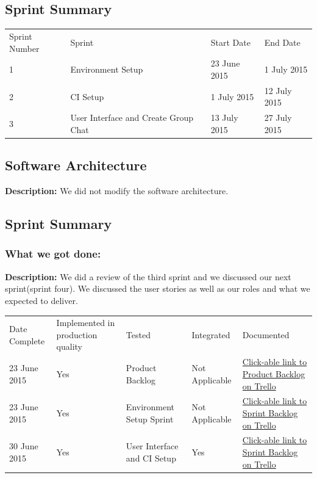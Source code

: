\documentclass[a4paper]{article}
\begin{document}
\subsection{Sprint Summary}
\setlength{\arrayrulewidth}{0.5mm}
\setlength{\tabcolsep}{12pt}
\renewcommand{\arraystretch}{2} 
\begin{tabular}{ |p{2.5cm}|p{2.5cm}|p{2.5cm} |p{2.5cm}| }
\hline
\rowcolor{lightgray}\multicolumn{4}{|c|}{Sprint Summary} \\
\hline
Sprint Number & Sprint & Start Date & End Date\\
\hline 
1 & Environment Setup & 23 June 2015 & 1 July 2015 \\
\hline
2 & CI Setup & 1 July 2015 & 12 July 2015 \\
\hline
3 & User Interface  and Create Group Chat & 13 July 2015 & 27 July 2015 \\
\hline

\end{tabular}

\subsection{Software Architecture}
\textbf{Description: }We did not modify the software architecture. \\

\subsection{Sprint Summary}
\subsubsection{What we got done: }
\textbf{Description: }We did a review of the third sprint and we discussed our next sprint(sprint four). We discussed the user stories as well as our roles and what we expected to deliver. \\

\setlength{\arrayrulewidth}{0.5mm}
\setlength{\tabcolsep}{12pt}
\renewcommand{\arraystretch}{2} 
\begin{tabular}{ |p{2.5cm}|p{2.5cm}|p{2.5cm}|p{2.5cm}| p{2.5cm}| }
\hline
\rowcolor{lightgray} \multicolumn{5}{|c|}{Completed Work} \\
\hline
Date Complete & Implemented in production quality & Tested & Integrated & Documented \\
\hline
23 June 2015 & Yes & Product Backlog & Not Applicable & \href{https://trello.com/b/FtBs3HX1}{Click-able link to Product Backlog on Trello}\\ \hline
23 June 2015 & Yes & Environment Setup Sprint & Not Applicable & \href{https://trello.com/b/hBJF6EUd}{Click-able link to Sprint Backlog on Trello}\\ 
\hline
30 June 2015 & Yes & User Interface and CI Setup & Yes & \href{https://trello.com/b/hBJF6EUd}{Click-able link to Sprint Backlog on Trello}\\ 
\hline

\end{tabular}
\end{document}
